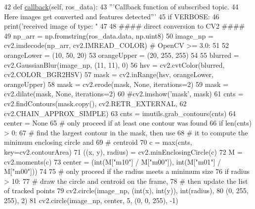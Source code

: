 \begin{DoxyCode}
42     \textcolor{keyword}{def }\hyperlink{classrobot__following_1_1image__feature_af3eddd8a93175ab03651d9ea0352ab56}{callback}(self, ros\_data):
43         \textcolor{stringliteral}{'''Callback function of subscribed topic. }
44 \textcolor{stringliteral}{        Here images get converted and features detected'''}
45         \textcolor{keywordflow}{if} VERBOSE:
46             print(\textcolor{stringliteral}{'received image of type: "%
47 
48         \textcolor{comment}{#### direct conversion to CV2 ####}
49         np\_arr = np.fromstring(ros\_data.data, np.uint8)
50         image\_np = cv2.imdecode(np\_arr, cv2.IMREAD\_COLOR)  \textcolor{comment}{# OpenCV >= 3.0:}
51 
52         orangeLower = (10, 50, 20)
53         orangeUpper = (20, 255, 255)
54 
55         blurred = cv2.GaussianBlur(image\_np, (11, 11), 0)
56         hsv = cv2.cvtColor(blurred, cv2.COLOR\_BGR2HSV)
57         mask = cv2.inRange(hsv, orangeLower, orangeUpper)
58         mask = cv2.erode(mask, \textcolor{keywordtype}{None}, iterations=2)
59         mask = cv2.dilate(mask, \textcolor{keywordtype}{None}, iterations=2)
60         \textcolor{comment}{#cv2.imshow('mask', mask)}
61         cnts = cv2.findContours(mask.copy(), cv2.RETR\_EXTERNAL,
62                                 cv2.CHAIN\_APPROX\_SIMPLE)
63         cnts = imutils.grab\_contours(cnts)
64         center = \textcolor{keywordtype}{None}
65         \textcolor{comment}{# only proceed if at least one contour was found}
66         \textcolor{keywordflow}{if} len(cnts) > 0:
67             \textcolor{comment}{# find the largest contour in the mask, then use}
68             \textcolor{comment}{# it to compute the minimum enclosing circle and}
69             \textcolor{comment}{# centroid}
70             c = max(cnts, key=cv2.contourArea)
71             ((x, y), radius) = cv2.minEnclosingCircle(c)
72             M = cv2.moments(c)
73             center = (int(M[\textcolor{stringliteral}{"m10"}] / M[\textcolor{stringliteral}{"m00"}]), int(M[\textcolor{stringliteral}{"m01"}] / M[\textcolor{stringliteral}{"m00"}]))
74 
75             \textcolor{comment}{# only proceed if the radius meets a minimum size}
76             \textcolor{keywordflow}{if} radius > 10:
77                 \textcolor{comment}{# draw the circle and centroid on the frame,}
78                 \textcolor{comment}{# then update the list of tracked points}
79                 cv2.circle(image\_np, (int(x), int(y)), int(radius),
80                            (0, 255, 255), 2)
81                 cv2.circle(image\_np, center, 5, (0, 0, 255), -1)
}
\end{DoxyCode}
